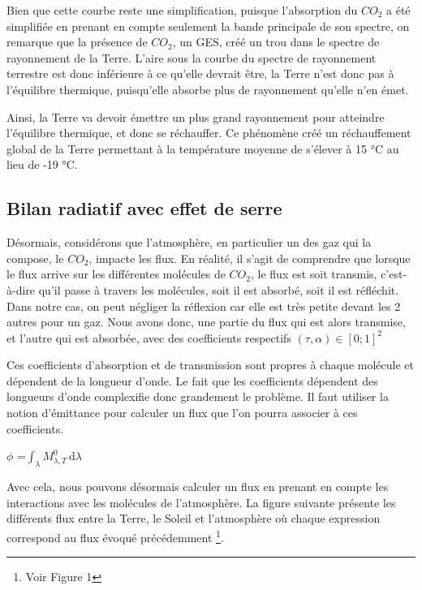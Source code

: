 \documentclass[a4paper, 12pt]{report} %
\begin{document}
Bien que cette courbe reste une simplification, puisque l'absorption du $CO_2$ a été simplifiée en prenant en compte seulement la bande principale de son spectre, on remarque que la présence de $CO_2$, un GES, créé un trou dans le spectre de rayonnement de la Terre. L'aire sous la courbe du spectre de rayonnement terrestre est donc inférieure à ce qu'elle devrait être, la Terre n'est donc pas à l'équilibre thermique, puisqu'elle absorbe plus de rayonnement qu'elle n'en émet.
\vspace{\baselineskip}

Ainsi, la Terre va devoir émettre un plus grand rayonnement pour atteindre l'équilibre thermique, et donc se réchauffer. Ce phénomène créé un réchauffement global de la Terre permettant à la 
température moyenne de s'élever à 15 °C au lieu de -19 °C. 
	

\subsection{Bilan radiatif avec effet de serre}

Désormais, considérons que l’atmosphère, en particulier un des gaz qui la compose, le $CO_2$, impacte les flux. 
En réalité, il s’agit de comprendre que lorsque le flux arrive sur les différentes molécules de $CO_2$, le flux est soit transmis, c’est-à-dire qu’il passe à travers les molécules, soit il est absorbé, soit il est réfléchit. Dans notre cas, on peut négliger la réflexion car elle est très petite devant les 2 autres pour un gaz. Nous avons donc, une partie du flux qui est alors transmise, et l’autre qui est absorbée, avec des coefficients respectifs $(\tau,\alpha) \in [0;1]^2$
\vspace{\baselineskip}

Ces coefficients d'absorption et de transmission sont propres à chaque molécule et dépendent de la longueur d’onde. Le fait que les coefficients dépendent des longueurs d’onde complexifie donc grandement le problème. Il faut utiliser la notion d'émittance pour calculer un flux que l'on pourra associer à ces coefficients.  

\begin{center}
$\phi$ =$\int_{\lambda} M^0_{\lambda,T} \, \mathrm{d}\lambda$
\end{center}

Avec cela, nous pouvons désormais calculer un flux en prenant en compte les interactions avec les molécules de l’atmosphère. La figure suivante présente les différents flux entre la Terre, le Soleil et l'atmosphère où chaque expression correspond au flux évoqué précédemment \footnote{Voir Figure 1}.  \vspace{\baselineskip}  
\end{document}
